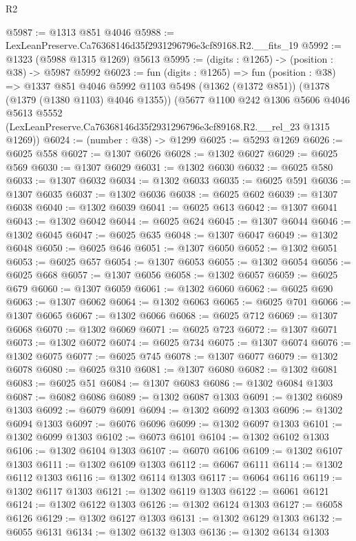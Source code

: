 \begin{lexlean}{R2}
\begin{coremodule}
@5987 := @1313 @851 @4046
@5988 := LexLeanPreserve.Ca76368146d35f2931296796e3cf89168.R2.__fits_19
@5992 := @1323 (@5988 @1315 @1269) @5613
@5995 := (digits : @1265) -> (position : @38) -> @5987 @5992
@6023 := fun (digits : @1265) =>
  fun (position : @38) =>
  @1337
    @851
    @4046
    @5992
    @1103
    @5498
    (@1362 (@1372 @851))
    (@1378 (@1379 (@1380 @1103) @4046 @1355))
    (@5677
      @1100
      @242
      @1306
      @5606
      @4046
      @5613
      @5552
      (LexLeanPreserve.Ca76368146d35f2931296796e3cf89168.R2.__rel_23 @1315 @1269))
@6024 := (number : @38) -> @1299
@6025 := @5293 @1269
@6026 := @6025 @558
@6027 := @1307 @6026
@6028 := @1302 @6027
@6029 := @6025 @569
@6030 := @1307 @6029
@6031 := @1302 @6030
@6032 := @6025 @580
@6033 := @1307 @6032
@6034 := @1302 @6033
@6035 := @6025 @591
@6036 := @1307 @6035
@6037 := @1302 @6036
@6038 := @6025 @602
@6039 := @1307 @6038
@6040 := @1302 @6039
@6041 := @6025 @613
@6042 := @1307 @6041
@6043 := @1302 @6042
@6044 := @6025 @624
@6045 := @1307 @6044
@6046 := @1302 @6045
@6047 := @6025 @635
@6048 := @1307 @6047
@6049 := @1302 @6048
@6050 := @6025 @646
@6051 := @1307 @6050
@6052 := @1302 @6051
@6053 := @6025 @657
@6054 := @1307 @6053
@6055 := @1302 @6054
@6056 := @6025 @668
@6057 := @1307 @6056
@6058 := @1302 @6057
@6059 := @6025 @679
@6060 := @1307 @6059
@6061 := @1302 @6060
@6062 := @6025 @690
@6063 := @1307 @6062
@6064 := @1302 @6063
@6065 := @6025 @701
@6066 := @1307 @6065
@6067 := @1302 @6066
@6068 := @6025 @712
@6069 := @1307 @6068
@6070 := @1302 @6069
@6071 := @6025 @723
@6072 := @1307 @6071
@6073 := @1302 @6072
@6074 := @6025 @734
@6075 := @1307 @6074
@6076 := @1302 @6075
@6077 := @6025 @745
@6078 := @1307 @6077
@6079 := @1302 @6078
@6080 := @6025 @310
@6081 := @1307 @6080
@6082 := @1302 @6081
@6083 := @6025 @51
@6084 := @1307 @6083
@6086 := @1302 @6084 @1303
@6087 := @6082 @6086
@6089 := @1302 @6087 @1303
@6091 := @1302 @6089 @1303
@6092 := @6079 @6091
@6094 := @1302 @6092 @1303
@6096 := @1302 @6094 @1303
@6097 := @6076 @6096
@6099 := @1302 @6097 @1303
@6101 := @1302 @6099 @1303
@6102 := @6073 @6101
@6104 := @1302 @6102 @1303
@6106 := @1302 @6104 @1303
@6107 := @6070 @6106
@6109 := @1302 @6107 @1303
@6111 := @1302 @6109 @1303
@6112 := @6067 @6111
@6114 := @1302 @6112 @1303
@6116 := @1302 @6114 @1303
@6117 := @6064 @6116
@6119 := @1302 @6117 @1303
@6121 := @1302 @6119 @1303
@6122 := @6061 @6121
@6124 := @1302 @6122 @1303
@6126 := @1302 @6124 @1303
@6127 := @6058 @6126
@6129 := @1302 @6127 @1303
@6131 := @1302 @6129 @1303
@6132 := @6055 @6131
@6134 := @1302 @6132 @1303
@6136 := @1302 @6134 @1303

\end{coremodule}
\end{lexlean}
